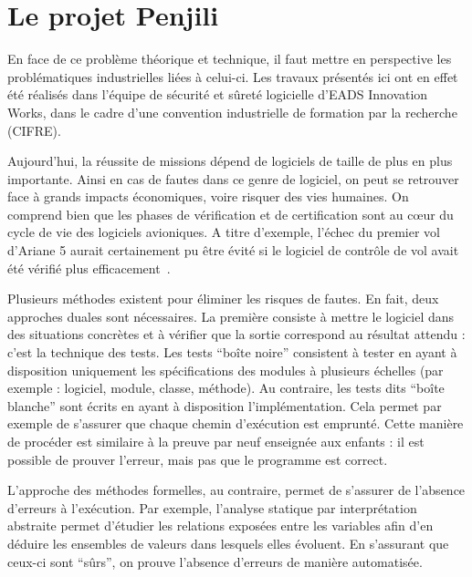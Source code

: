 
\section{Le projet Penjili}

En face de ce problème théorique et technique, il faut mettre en perspective les
problématiques industrielles liées à celui-ci. Les travaux présentés ici ont en
effet été réalisés dans l'équipe de sécurité et sûreté logicielle d'EADS
Innovation Works, dans le cadre d'une convention industrielle de formation par
la recherche (CIFRE).

Aujourd'hui, la réussite de missions dépend de logiciels de taille de plus en
plus importante. Ainsi en cas de fautes dans ce genre de logiciel, on peut se
retrouver face à grands impacts économiques, voire risquer des vies humaines. On
comprend bien que les phases de vérification et de certification sont au cœur
du cycle de vie des logiciels avioniques. A titre d'exemple, l'échec du premier
vol d'Ariane 5 aurait certainement pu être évité si le logiciel de contrôle de
vol avait été vérifié plus efficacement~\cite{Ariane501}.

Plusieurs méthodes existent pour éliminer les risques de fautes. En fait, deux
approches duales sont nécessaires. La première consiste à mettre le logiciel
dans des situations concrètes et à vérifier que la sortie correspond au résultat
attendu : c'est la technique des tests.  Les tests \enquote{boîte noire}
consistent à tester en ayant à disposition uniquement les spécifications des
modules à plusieurs échelles (par exemple : logiciel, module, classe, méthode).
Au contraire, les tests dits \enquote{boîte blanche} sont écrits en ayant à
disposition l'implémentation. Cela permet par exemple de s'assurer que chaque
chemin d'exécution est emprunté. Cette manière de procéder est similaire à la
preuve par neuf enseignée aux enfants : il est possible de prouver l'erreur,
mais pas que le programme est correct.


L'approche des méthodes formelles, au contraire, permet de s'assurer de
l'absence d'erreurs à l'exécution. Par exemple, l'analyse statique par
interprétation abstraite permet d'étudier les relations exposées entre les
variables afin d'en déduire les ensembles de valeurs dans lesquels elles
évoluent. En s'assurant que ceux-ci sont \enquote{sûrs}, on prouve l'absence
d'erreurs de manière automatisée.

